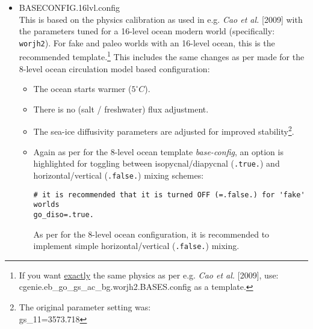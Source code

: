 \begin{itemize}[noitemsep]
\vspace{1mm}
\item \textsf{\small BASECONFIG.16lvl.config}
\vspace{1mm}
\\This is based on the physics calibration as used in e.g. \textit{Cao et al.} [2009] with the parameters tuned for a 16-level ocean modern world (specifically: \texttt{worjh2}). For fake and paleo worlds with an 16-level ocean, this is the recommended template.\footnote{If you want \uline{exactly} the same physics as per e.g. \textit{Cao et al.} [2009], use: \\\textsf{\footnotesize cgenie.eb\_go\_gs\_ac\_bg.worjh2.BASES.config} as a template.} This includes the same changes as per made for the 8-level ocean circulation model based configuration:
\begin{itemize}[noitemsep]
\vspace{1mm}
\item The ocean starts warmer (\(5^{\circ}C\)).
\vspace{1mm}
\item There is no (salt / freshwater) flux adjustment.
\vspace{1mm}
\item The sea-ice diffusivity parameters are adjusted for improved stability\footnote{The original parameter setting was:
\\gs\_11=3573.718}.
\end{itemize}
\vspace{1mm}

\begin{itemize}[noitemsep]
\vspace{1mm}
\item
Again as per for the 8-level ocean template \textit{base-config}, an option is highlighted for toggling between isopycnal/diapycnal (\texttt{.true.}) and horizontal/vertical (\texttt{.false.}) mixing schemes:
\small\vspace{-2pt}\begin{verbatim}
# it is recommended that it is turned OFF (=.false.) for 'fake' worlds
go_diso=.true.
\end{verbatim}\vspace{-2pt}\normalsize
As per for the 8-level ocean configuration, it is recommended to implement simple horizontal/vertical (\texttt{.false.}) mixing.
\end{itemize}


\end{itemize}
